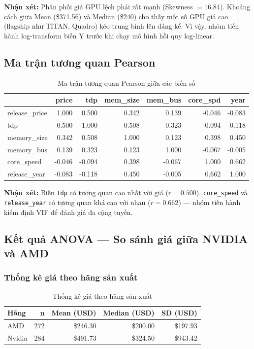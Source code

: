 \documentclass[a4paper]{article}
\begin{document}
\textbf{Nhận xét:} Phân phối giá GPU lệch phải rất mạnh (Skewness $= 16.84$). Khoảng cách giữa Mean (\$371.56) và Median (\$240) cho thấy một số GPU giá cao (flagship như TITAN, Quadro) kéo trung bình lên đáng kể. Vì vậy, nhóm tiến hành log-transform biến Y trước khi chạy mô hình hồi quy log-linear.

\subsection{Ma trận tương quan Pearson}

\begin{table}[h!]
\centering
\caption{Ma trận tương quan Pearson giữa các biến số}
\begin{tabular}{|l|r|r|r|r|r|r|}
\hline
 & \textbf{price} & \textbf{tdp} & \textbf{mem\_size} & \textbf{mem\_bus} & \textbf{core\_spd} & \textbf{year} \\
\hline
release\_price & 1.000 & 0.500 & 0.342 & 0.139 & -0.046 & -0.083 \\
tdp & 0.500 & 1.000 & 0.508 & 0.323 & -0.094 & -0.118 \\
memory\_size & 0.342 & 0.508 & 1.000 & 0.123 & 0.398 & 0.450 \\
memory\_bus & 0.139 & 0.323 & 0.123 & 1.000 & -0.067 & -0.005 \\
core\_speed & -0.046 & -0.094 & 0.398 & -0.067 & 1.000 & 0.662 \\
release\_year & -0.083 & -0.118 & 0.450 & -0.005 & 0.662 & 1.000 \\
\hline
\end{tabular}
\end{table}

\textbf{Nhận xét:} Biến \texttt{tdp} có tương quan cao nhất với giá ($r = 0.500$). \texttt{core\_speed} và \texttt{release\_year} có tương quan khá cao với nhau ($r = 0.662$) --- nhóm tiến hành kiểm định VIF để đánh giá đa cộng tuyến.

\subsection{Kết quả ANOVA --- So sánh giá giữa NVIDIA và AMD}

\subsubsection{Thống kê giá theo hãng sản xuất}

\begin{table}[h!]
\centering
\caption{Thống kê giá theo hãng sản xuất}
\begin{tabular}{|l|r|r|r|r|}
\hline
\textbf{Hãng} & \textbf{n} & \textbf{Mean (USD)} & \textbf{Median (USD)} & \textbf{SD (USD)} \\
\hline
AMD & 272 & \$246.30 & \$200.00 & \$197.93 \\
Nvidia & 284 & \$491.73 & \$324.50 & \$943.42 \\
\hline
\end{tabular}
\end{table}
\end{document}
